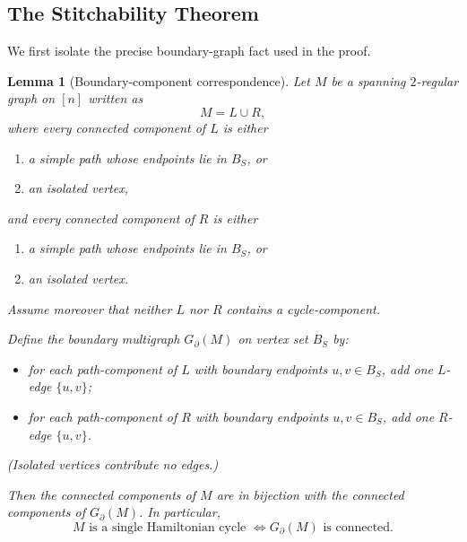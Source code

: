 \documentclass[11pt]{article}
\newtheorem{lemma}[theorem]{Lemma}
\begin{document}
\subsection{The Stitchability Theorem}

We first isolate the precise boundary-graph fact used in the proof.

\begin{lemma}[Boundary-component correspondence]\label{lem:boundary-component-correspondence}
Let $M$ be a spanning $2$-regular graph on $[n]$ written as
\[
M=L\cup R,
\]
where every connected component of $L$ is either
\begin{enumerate}
    \item a simple path whose endpoints lie in $B_S$, or
    \item an isolated vertex,
\end{enumerate}
and every connected component of $R$ is either
\begin{enumerate}
    \item a simple path whose endpoints lie in $B_S$, or
    \item an isolated vertex.
\end{enumerate}
Assume moreover that neither $L$ nor $R$ contains a cycle-component.

Define the boundary multigraph $G_\partial(M)$ on vertex set $B_S$ by:
\begin{itemize}
    \item for each path-component of $L$ with boundary endpoints $u,v\in B_S$, add one $L$-edge $\{u,v\}$;
    \item for each path-component of $R$ with boundary endpoints $u,v\in B_S$, add one $R$-edge $\{u,v\}$.
\end{itemize}
(Isolated vertices contribute no edges.)

Then the connected components of $M$ are in bijection with the connected components of $G_\partial(M)$. In particular,
\[
M \text{ is a single Hamiltonian cycle }
\iff
G_\partial(M)\text{ is connected.}
\]
\end{lemma}
\end{document}
